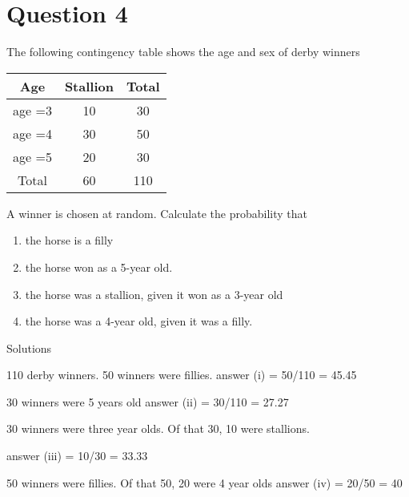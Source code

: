 
\section*{Question 4} 


The following contingency table shows the age and sex of derby winners





 \begin{tabular}{ccc}
Age	&	Stallion	&	Total	 \\ \hline


age =3	&	10	&	30	 \\ \hline


age =4 	&	30	&	50	 \\ \hline


age =5	&	20	&	30	 \\ \hline


Total	&	60	&	110	 \\ \hline

\end{tabular}







A winner is chosen at random. Calculate the probability that

\begin{enumerate}
\item the horse is a filly
\item the horse won as a 5-year old.
\item the horse was a stallion, given it won as a 3-year old
\item the horse was a 4-year old, given it was a filly.
\end{enumerate}





Solutions


110 derby winners. 50 winners were fillies.                                              answer (i) = 50/110 = 45.45 %


30 winners were 5 years old                                                    answer (ii) = 30/110 = 27.27%



30 winners were three year olds. Of that 30, 10 were stallions.       

answer (iii) = 10/30 = 33.33%


50 winners were fillies. Of that 50, 20 were 4 year olds                                                  answer (iv) = 20/50 = 40%

